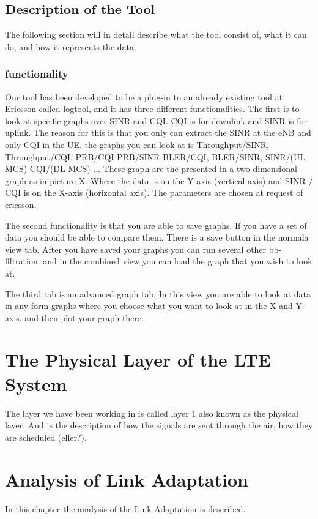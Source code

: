 \documentclass[cropmarks, frame, english]{idamasterthesis}
\begin{document}
\section{Description of the Tool}
The following section will in detail describe what the tool consist of, what it can do, and how it represents the data.

\subsection{functionality}
Our tool has been developed to be a plug-in to an already existing tool at Ericsson called logtool, and it has three different functionalities. The first is to look at specific graphs over SINR and CQI. CQI is for downlink and SINR is for uplink. The reason for this is that you only can extract the SINR at the eNB and only CQI in the UE. the graphs you can look at is Throughput/SINR, Throughput/CQI, PRB/CQI PRB/SINR BLER/CQI, BLER/SINR, SINR/(UL MCS) CQI/(DL MCS) ... These graph are the presented in a two dimensional graph as in picture X. Where the data is on the Y-axis (vertical axis) and SINR / CQI is on the X-axis (horizontal axis). The parameters are chosen at request of ericsson. 

The second functionality is that you are able to save graphs. If you have a set of data you should be able to compare them. There is a save button in the normala view tab. After you have saved your graphs you can run several other bb-filtration. and in the combined view you can load the graph that you wish to look at.

The third tab is an advanced graph tab. In this view you are able to look at data in any form graphs where you choose what you want to look at in the X and Y-axis. and then plot your graph there.
\chapter{The Physical Layer of the LTE System}
The layer we have been working in is called layer 1 also known as the physical layer. And is the description of how the signals are sent through the air, how they are scheduled (eller?).
 
\chapter{Analysis of Link Adaptation}
In this chapter the analysis of the Link Adaptation is described. 
\end{document}
